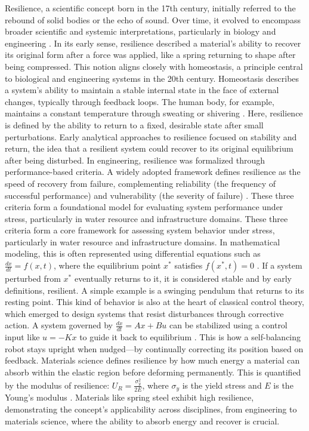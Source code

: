 Resilience, a scientific concept born in the 17th century, initially referred to the rebound of solid bodies or the echo of sound. Over time, it evolved to encompass broader scientific and systemic interpretations, particularly in biology and engineering \autocite{alexander2013resilience}. In its early sense, resilience described a material's ability to recover its original form after a force was applied, like a spring returning to shape after being compressed. This notion aligns closely with homeostasis, a principle central to biological and engineering systems in the 20th century. Homeostasis describes a system's ability to maintain a stable internal state in the face of external changes, typically through feedback loops. The human body, for example, maintains a constant temperature through sweating or shivering \autocite{wiener1948cybernetics}. Here, resilience is defined by the ability to return to a fixed, desirable state after small perturbations. Early analytical approaches to resilience focused on stability and return, the idea that a resilient system could recover to its original equilibrium after being disturbed. In engineering, resilience was formalized through performance-based criteria. A widely adopted framework defines resilience as the speed of recovery from failure, complementing reliability (the frequency of successful performance) and vulnerability (the severity of failure) \autocite{hashimoto1982reliability}. These three criteria form a foundational model for evaluating system performance under stress, particularly in water resource and infrastructure domains. These three criteria form a core framework for assessing system behavior under stress, particularly in water resource and infrastructure domains. In mathematical modeling, this is often represented using differential equations such as $\frac{dx}{dt} = f(x,t)$, where the equilibrium point $x^*$ satisfies $f(x^*,t) = 0$ \autocite{strogatz2018nonlinear}. If a system perturbed from $x^*$ eventually returns to it, it is considered stable and by early definitions, resilient. A simple example is a swinging pendulum that returns to its resting point. This kind of behavior is also at the heart of classical control theory, which emerged to design systems that resist disturbances through corrective action. A system governed by $\frac{dx}{dt} = Ax + Bu$ can be stabilized using a control input like $u = -Kx$ to guide it back to equilibrium \autocite{astrom2021feedback}. This is how a self-balancing robot stays upright when nudged—by continually correcting its position based on feedback. Materials science defines resilience by how much energy a material can absorb within the elastic region before deforming permanently. This is quantified by the modulus of resilience: $U_R = \frac{\sigma_y^2}{2E}$, where $\sigma_y$ is the yield stress and $E$ is the Young’s modulus \autocite{callister2020materials}. Materials like spring steel exhibit high resilience, demonstrating the concept's applicability across disciplines, from engineering to materials science, where the ability to absorb energy and recover is crucial.\\

